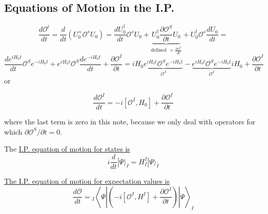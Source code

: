 \subsection{Equations of Motion in the I.P.}
$$
\frac{d \mathcal{O}^{l}}{d t}=\frac{d}{d t}\left(U_{0}^{+} \mathcal{O}^{s} U_{0}\right)=\frac{d U_{0}^{\dagger}}{d t} \mathcal{O}^{s} U_{0}+\underbrace{U_{0}^{\dagger} \frac{\partial \mathcal{O}^{S}}{\partial t} U_{0}}_{\text {defined }=\frac{\partial \mathcal{O}^{I}}{\partial t}}+U_{0}^{\dagger} \mathcal{O}^{s} \frac{d U_{0}}{d t}=
$$
$$
\frac{d e^{i H_{0} t}}{d t} \mathcal{O}^{S} e^{-i H_{0} t}+e^{i H_{0} t} \mathcal{O}^{S} \frac{d e^{-i H_{0} t}}{d t}+\frac{\partial \mathcal{O}^{I}}{\partial t}=i H_{0} \underbrace{e^{i H_{0} t} \mathcal{O}^{S} e^{-i H_{0} t}}_{\mathcal{O}^{I}}-\underbrace{e^{i H_{0} t} \mathcal{O}^{S} e^{-i H_{0} t}}_{\mathcal{O}^{I}} i H_{0}+\frac{\partial \mathcal{O}^{I}}{\partial t}
$$
or
\begin{qt}
\begin{equation}
\frac{d \mathcal{O}^{I}}{d t}=-i\left[\mathcal{O}^{I}, H_{0}\right]+\frac{\partial \mathcal{O}^{I}}{\partial t}
\end{equation}
\end{qt}
where the last term is zero in this note, because we only deal with operators for which $\partial \mathcal{O}^{S} / \partial t=0$. 

The \underline{I.P. equation of motion for states is}
\begin{equation}
i \frac{d}{d t}|\Psi\rangle_{I}=H_{I}^{I}|\Psi\rangle_{I}
\end{equation}

\underline{The I.P. equation of motion for expectation values is}
\begin{equation}
\frac{d \overline{\mathcal{O}}}{d t}={}_{I}\left\langle\Psi\left|\left(-i\left[\mathcal{O}^{I}, H^{I}\right]+\frac{\partial \mathcal{O}^{I}}{\partial t}\right)\right| \Psi\right\rangle_{I}
\end{equation}